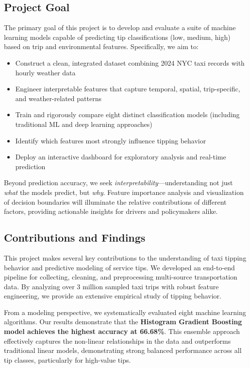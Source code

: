 \documentclass[11pt]{article}
\begin{document}
\subsection{Project Goal}

The primary goal of this project is to develop and evaluate a suite of machine learning models capable of predicting tip classifications (low, medium, high) based on trip and environmental features. Specifically, we aim to:

\begin{itemize}
    \item Construct a clean, integrated dataset combining 2024 NYC taxi records with hourly weather data
    \item Engineer interpretable features that capture temporal, spatial, trip-specific, and weather-related patterns
    \item Train and rigorously compare eight distinct classification models (including traditional ML and deep learning approaches)
    \item Identify which features most strongly influence tipping behavior
    \item Deploy an interactive dashboard for exploratory analysis and real-time prediction
\end{itemize}

Beyond prediction accuracy, we seek \textit{interpretability}—understanding not just \textit{what} the models predict, but \textit{why}. Feature importance analysis and visualization of decision boundaries will illuminate the relative contributions of different factors, providing actionable insights for drivers and policymakers alike.

\subsection{Contributions and Findings}
This project makes several key contributions to the understanding of taxi tipping behavior and predictive modeling of service tips. We developed an end-to-end pipeline for collecting, cleaning, and preprocessing multi-source transportation data. By analyzing over 3 million sampled taxi trips with robust feature engineering, we provide an extensive empirical study of tipping behavior.

From a modeling perspective, we systematically evaluated eight machine learning algorithms. Our results demonstrate that the \textbf{Histogram Gradient Boosting model achieves the highest accuracy at 66.68\%}. This ensemble approach effectively captures the non-linear relationships in the data and outperforms traditional linear models, demonstrating strong balanced performance across all tip classes, particularly for high-value tips.
\end{document}
